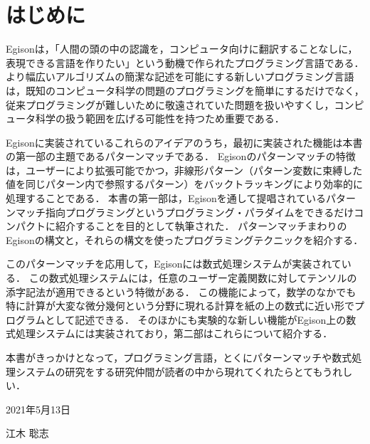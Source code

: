 \chapter*{はじめに} 

Egisonは，「人間の頭の中の認識を，コンピュータ向けに翻訳することなしに，表現できる言語を作りたい」という動機で作られたプログラミング言語である．
より幅広いアルゴリズムの簡潔な記述を可能にする新しいプログラミング言語は，既知のコンピュータ科学の問題のプログラミングを簡単にするだけでなく，従来プログラミングが難しいために敬遠されていた問題を扱いやすくし，コンピュータ科学の扱う範囲を広げる可能性を持つため重要である．

Egisonに実装されているこれらのアイデアのうち，最初に実装された機能は本書の第一部の主題であるパターンマッチである．
Egisonのパターンマッチの特徴は，ユーザーにより拡張可能でかつ，非線形パターン（パターン変数に束縛した値を同じパターン内で参照するパターン）をバックトラッキングにより効率的に処理することである．
本書の第一部は，Egisonを通して提唱されているパターンマッチ指向プログラミングというプログラミング・パラダイムをできるだけコンパクトに紹介することを目的として執筆された．
パターンマッチまわりのEgisonの構文と，それらの構文を使ったプログラミングテクニックを紹介する．

このパターンマッチを応用して，Egisonには数式処理システムが実装されている．
この数式処理システムには，任意のユーザー定義関数に対してテンソルの添字記法が適用できるという特徴がある．
この機能によって，数学のなかでも特に計算が大変な微分幾何という分野に現れる計算を紙の上の数式に近い形でプログラムとして記述できる．
そのほかにも実験的な新しい機能がEgison上の数式処理システムには実装されており，第二部はこれらについて紹介する．

本書がきっかけとなって，プログラミング言語，とくにパターンマッチや数式処理システムの研究をする研究仲間が読者の中から現れてくれたらとてもうれしい．

\begin{flushright}
  2021年5月13日
  
  江木 聡志
\end{flushright}
